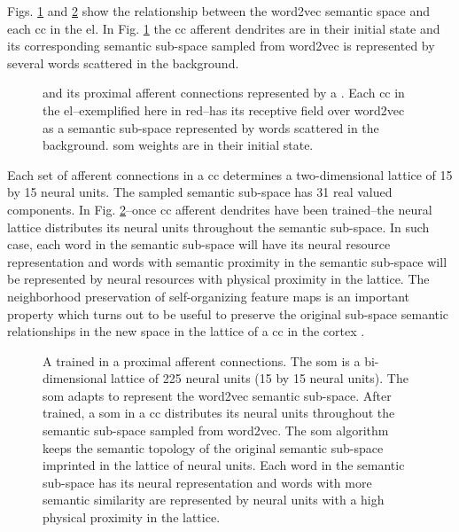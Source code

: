{Figs. \ref{fig:CorticalColumnSOM} and \ref{fig:CorticalColumnTrainedSOM} show the relationship between the word2vec semantic space and each \gls{cc} in the \gls{el}. In Fig. \ref{fig:CorticalColumnSOM} the \gls{cc} afferent dendrites are in their initial state and its corresponding semantic sub-space sampled from word2vec is represented by several words scattered in the background.
 
\begin{figure}[h!]
    \centering
    \caption{  and its proximal afferent connections represented by a . Each \gls{cc} in the \gls{el}--exemplified here in red--has its receptive field over word2vec as a semantic sub-space represented by words scattered in the background. \gls{som} weights are in their initial state.}
    \label{fig:CorticalColumnSOM}
\end{figure}
 
 

Each set of afferent connections in a \gls{cc} determines a two-dimensional lattice of 15 by 15 neural units. The sampled semantic sub-space has 31 real valued components. In Fig. \ref{fig:CorticalColumnTrainedSOM}--once \gls{cc} afferent dendrites have been trained--the neural lattice distributes its neural units throughout the semantic sub-space. In such case, each word in the semantic sub-space will have its neural resource representation and words with semantic proximity in the semantic sub-space will be represented by neural resources with physical proximity in the lattice. The neighborhood preservation of self-organizing feature maps is an important property which turns out to be useful to preserve the original sub-space semantic relationships in the new space in the lattice of a \gls{cc} in the cortex \cite{557663}.


\begin{figure}[h!]
    \centering
    \caption{A trained  in a  proximal afferent connections. The \gls{som} is a bi-dimensional lattice of 225 neural units (15 by 15 neural units). The \gls{som} adapts to represent the word2vec semantic sub-space. After trained, a \gls{som} in a \gls{cc} distributes its neural units throughout the semantic sub-space sampled from word2vec. The \gls{som} algorithm keeps the semantic topology of the original semantic sub-space imprinted in the lattice of neural units. Each word in the semantic sub-space has its neural representation and words with more semantic similarity are represented by neural units with a high physical proximity in the lattice.}
    \label{fig:CorticalColumnTrainedSOM}
\end{figure}




}
